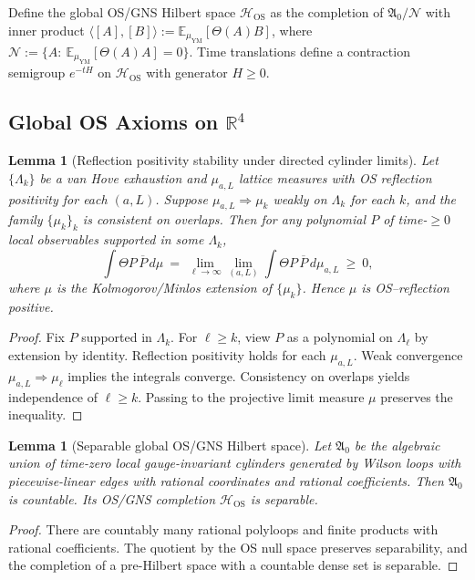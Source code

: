 \documentclass[11pt]{amsart}
\theoremstyle{plain}
\newtheorem{lemma}[theorem]{Lemma}
\theoremstyle{definition}
\theoremstyle{remark}
\begin{document}
Define the global OS/GNS Hilbert space $\mathcal H_{\mathrm{OS}}$ as the completion of $\mathfrak A_0/\mathcal N$ with inner product $\langle [A],[B]\rangle:=\mathbb E_{\mu_{\mathrm{YM}}}[\Theta(A)B]$, where $\mathcal N:=\{A:\ \mathbb E_{\mu_{\mathrm{YM}}}[\Theta(A)A]=0\}$. Time translations define a contraction semigroup $e^{-tH}$ on $\mathcal H_{\mathrm{OS}}$ with generator $H\ge 0$.

\subsection{Global OS Axioms on $\mathbb R^4$}

\begin{lemma}[Reflection positivity stability under directed cylinder limits]\label{lem:rp-stability-projective}
Let $\{\Lambda_k\}$ be a van Hove exhaustion and $\mu_{a,L}$ lattice measures with OS reflection positivity for each $(a,L)$. Suppose $\mu_{a,L}\Rightarrow \mu_k$ weakly on $\Lambda_k$ for each $k$, and the family $\{\mu_k\}_k$ is consistent on overlaps. Then for any polynomial $P$ of time-$\ge 0$ local observables supported in some $\Lambda_k$,
\[
  \int \Theta P\,\overline{P}\,d\mu\ =\ \lim_{\ell\to\infty}\lim_{(a,L)} \int \Theta P\,\overline{P}\,d\mu_{a,L}\ \ge\ 0,
\]
where $\mu$ is the Kolmogorov/Minlos extension of $\{\mu_k\}$. Hence $\mu$ is OS--reflection positive.
\end{lemma}
\begin{proof}
Fix $P$ supported in $\Lambda_k$. For $\ell\ge k$, view $P$ as a polynomial on $\Lambda_\ell$ by extension by identity. Reflection positivity holds for each $\mu_{a,L}$. Weak convergence $\mu_{a,L}\Rightarrow \mu_\ell$ implies the integrals converge. Consistency on overlaps yields independence of $\ell\ge k$. Passing to the projective limit measure $\mu$ preserves the inequality.
\end{proof}

\begin{lemma}[Separable global OS/GNS Hilbert space]\label{lem:separable}
Let $\mathfrak A_0$ be the algebraic union of time-zero local gauge-invariant cylinders generated by Wilson loops with piecewise-linear edges with rational coordinates and rational coefficients. Then $\mathfrak A_0$ is countable. Its OS/GNS completion $\mathcal H_{\mathrm{OS}}$ is separable.
\end{lemma}
\begin{proof}
There are countably many rational polyloops and finite products with rational coefficients. The quotient by the OS null space preserves separability, and the completion of a pre-Hilbert space with a countable dense set is separable.
\end{proof}
\end{document}
